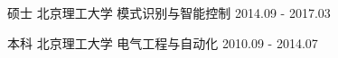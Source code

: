 


\begin{ljys}


\ljy
{} %
{硕士 北京理工大学 模式识别与智能控制} %
{2014.09 - 2017.03} %
{} %

\ljy
{} %
{本科 北京理工大学 电气工程与自动化} %
{2010.09 - 2014.07} %
{} %
\end{ljys}





